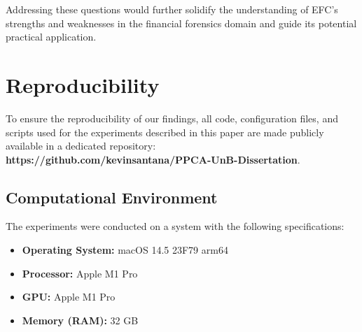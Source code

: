 \documentclass[12pt]{article}
\begin{document}
Addressing these questions would further solidify the understanding of EFC's strengths and weaknesses in the financial
forensics domain and guide its potential practical application.


\section{Reproducibility} \label{sec:reproducibility}
To ensure the reproducibility of our findings, all code, configuration files, and scripts used for the experiments described
in this paper are made publicly available in a dedicated repository: \textbf{https://github.com/kevinsantana/PPCA-UnB-Dissertation}.

\subsection{Computational Environment} \label{subsection:environment}
The experiments were conducted on a system with the following specifications:
\begin{itemize}
    \item \textbf{Operating System:} macOS 14.5 23F79 arm64
    \item \textbf{Processor:} Apple M1 Pro
    \item \textbf{GPU:} Apple M1 Pro
    \item \textbf{Memory (RAM):} 32 GB
\end{itemize}



\end{document}
